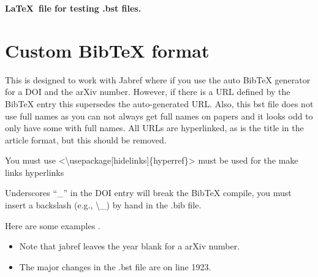 \documentclass[11pt,letterpaper]{article}
\begin{document}
\begin{center}{\Large 
	\textbf{\LaTeX\ file for testing .bst files.}}
\end{center}





	
		
		
		
	\section*{Custom BibTeX format}		

	This is designed to work with Jabref where if you use the auto BibTeX generator for a DOI and the arXiv number. However, if there is a URL defined by the BibTeX entry this supersedes the auto-generated URL. Also, this bst file does not use full names as you can not always get full names on papers and it looks odd to only have some with full names. All URLs are hyperlinked, as is the title in the article format, but this should be removed. 
	
	
	You must use <\textbackslash usepackage[hidelinks]\{hyperref\}> must be used for the make links hyperlinks
	
	Underscores ``\_'' in the DOI entry will break the BibTeX compile, you must insert a backslash (e.g., \textbackslash \_) by hand in the .bib file. 
	
	
	
	
	
	
	Here are some examples \cite{test1,test2,test3,test4,test5,test6,test7,test8,test9}.	
	
	\begin{itemize}
	\item Note that jabref leaves the year blank for a arXiv number. 
	\item The major changes in the .bst file are on line 1923.
	\end{itemize}
	
	
	
	



			
\pagestyle{empty}
	\FloatBarrier
	\renewcommand{\thepage}{}
	\renewcommand\refname{References Cited}
	
\end{document}
